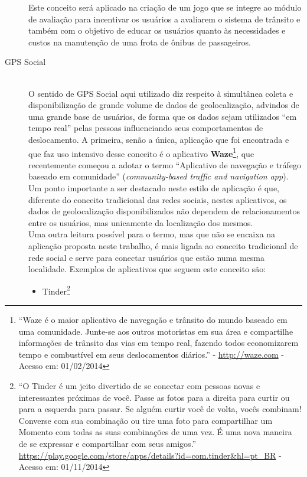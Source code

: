 \begin{description}
\begin{citacao}
	    \end{citacao}
	    Este conceito será aplicado na criação de um jogo que se integre ao módulo de avaliação para incentivar os usuários a avaliarem o sistema de trânsito e também com o objetivo de educar os usuários quanto às necessidades e custos na manutenção de uma frota de ônibus de passageiros.%
%
	\item[GPS Social] \hfill \\
	    O sentido de GPS Social aqui utilizado diz respeito à simultânea coleta e disponibilização de grande volume de dados de geolocalização, advindos de uma grande base de usuários, de forma que os dados sejam utilizados ``em tempo real'' pelas pessoas influenciando seus comportamentos de deslocamento. A primeira, senão a única, aplicação que foi encontrada e que faz uso intensivo desse conceito é o aplicativo \textbf{Waze}\footnote{``Waze é o maior aplicativo de navegação e trânsito do mundo baseado em uma comunidade. Junte-se aos outros motoristas em sua área e compartilhe informações de trânsito das vias em tempo real, fazendo todos economizarem tempo e combustível em seus deslocamentos diários.'' - \url{http://waze.com} - Acesso em: 01/02/2014}, que recentemente começou a adotar o termo ``Aplicativo de navegação e tráfego baseado em comunidade'' (\textit{community-based traffic and navigation app}).\\
	    Um ponto importante a ser destacado neste estilo de aplicação é que, diferente do conceito tradicional das redes sociais, nestes aplicativos, os dados de geolocalização disponibilizados não dependem de relacionamentos entre os usuários, mas unicamente da localização dos mesmos. \\
	    Uma outra leitura possível para o termo, mas que não se encaixa na aplicação proposta neste trabalho, é mais ligada ao conceito tradicional de rede social e serve para conectar usuários que estão numa mesma localidade. Exemplos de aplicativos que seguem este conceito são:%
	    \begin{itemize}
        \item Tinder\footnote{``O Tinder é um jeito divertido de se conectar com pessoas novas e interessantes próximas de você. Passe as fotos para a direita para curtir ou para a esquerda para passar. Se alguém curtir você de volta, vocês combinam! Converse com sua combinação ou tire uma foto para compartilhar um Momento com todas as suas combinações de uma vez. É uma nova maneira de se expressar e compartilhar com seus amigos.'' {\url{https://play.google.com/store/apps/details?id=com.tinder&hl=pt_BR}} - Acesso em: 01/11/2014}

\end{itemize}
\end{description}
